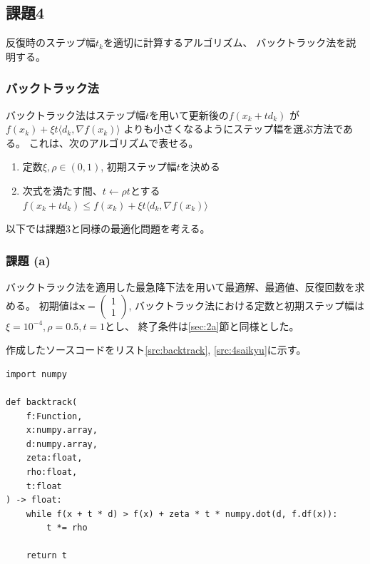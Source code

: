 \documentclass[a4j, titlepage]{jsarticle}
\numberwithin{equation}{section}
\begin{document}
    \subsection{課題4} \label{sec:kadai4}
        反復時のステップ幅$t_k$を適切に計算するアルゴリズム、
        バックトラック法を説明する。

        \subsubsection{バックトラック法}
            バックトラック法はステップ幅$t$を用いて更新後の$f(x_k+td_k)$
            が$f(x_k)+\xi t\langle d_k, \nabla f(x_k)\rangle$
            よりも小さくなるようにステップ幅を選ぶ方法である。
            これは、次のアルゴリズムで表せる。

            \begin{enumerate}
                \item 定数$\xi, \rho \in (0, 1)$, 初期ステップ幅$t$を決める
                \item {
                    次式を満たす間、$t\leftarrow\rho t$とする \\
                    $f(x_k+td_k)\leq f(x_k)+\xi t\langle d_k, \nabla f(x_k)\rangle$
                }
            \end{enumerate}

        以下では課題3と同様の最適化問題を考える。

        \subsubsection{課題 (a)} \label{sec:4a}
            バックトラック法を適用した最急降下法を用いて最適解、最適値、反復回数を求める。
            初期値は$\bm{x}=\begin{pmatrix}
                1 \\
                1
            \end{pmatrix}$,
            バックトラック法における定数と初期ステップ幅は
            $\xi=10^{-4}, \rho=0.5, t=1$とし、
            終了条件は\ref{sec:2a}節と同様とした。

            作成したソースコードをリスト\ref{src:backtrack}, \ref{src:4saikyu}に示す。

            \begin{lstlisting}[caption=バックトラック法の実装, label=src:backtrack]
import numpy

def backtrack(
    f:Function,
    x:numpy.array,
    d:numpy.array,
    zeta:float,
    rho:float,
    t:float
) -> float:
    while f(x + t * d) > f(x) + zeta * t * numpy.dot(d, f.df(x)):
        t *= rho
        
    return t
            \end{lstlisting}
\end{document}
